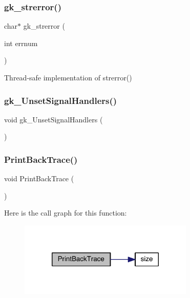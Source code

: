 \subsubsection{\texorpdfstring{gk\+\_\+strerror()}{gk\_strerror()}}
{\footnotesize\ttfamily char$\ast$ gk\+\_\+strerror (\begin{DoxyParamCaption}\item[{int}]{errnum }\end{DoxyParamCaption})}



Thread-\/safe implementation of strerror() 

\mbox{\label{a00026_a972beb4b92a7f6e004291460c4d25d4a}} 
\subsubsection{\texorpdfstring{gk\+\_\+\+Unset\+Signal\+Handlers()}{gk\_UnsetSignalHandlers()}}
{\footnotesize\ttfamily void gk\+\_\+\+Unset\+Signal\+Handlers (\begin{DoxyParamCaption}{ }\end{DoxyParamCaption})}

\mbox{\label{a00026_aad9319a482c50504ad3d76158bfed8c7}} 
\subsubsection{\texorpdfstring{Print\+Back\+Trace()}{PrintBackTrace()}}
{\footnotesize\ttfamily void Print\+Back\+Trace (\begin{DoxyParamCaption}{ }\end{DoxyParamCaption})}

Here is the call graph for this function\+:\nopagebreak
\begin{figure}[H]
\begin{center}
\leavevmode
\includegraphics[width=236pt]{a00026_aad9319a482c50504ad3d76158bfed8c7_cgraph}
\end{center}
\end{figure}


